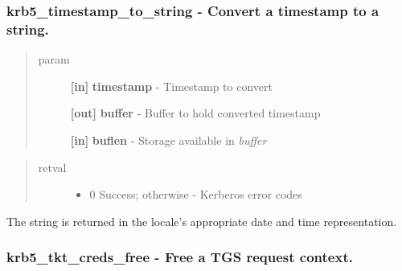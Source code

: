 \documentclass[letterpaper,10pt,english]{sphinxmanual}
\begin{document}
\subsubsection{krb5\_timestamp\_to\_string -  Convert a timestamp to a string.}
\label{appdev/refs/api/krb5_timestamp_to_string::doc}\label{appdev/refs/api/krb5_timestamp_to_string:krb5-timestamp-to-string-convert-a-timestamp-to-a-string}

\begin{fulllineitems}
\label{appdev/refs/api/krb5_timestamp_to_string:krb5_timestamp_to_string}
\end{fulllineitems}

\begin{quote}\begin{description}
\item[{param}] \leavevmode
\textbf{{[}in{]}} \textbf{timestamp} - Timestamp to convert

\textbf{{[}out{]}} \textbf{buffer} - Buffer to hold converted timestamp

\textbf{{[}in{]}} \textbf{buflen} - Storage available in \emph{buffer}

\end{description}\end{quote}
\begin{quote}\begin{description}
\item[{retval}] \leavevmode\begin{itemize}
\item {} 
0   Success; otherwise - Kerberos error codes

\end{itemize}

\end{description}\end{quote}

The string is returned in the locale's appropriate date and time representation.


\subsubsection{krb5\_tkt\_creds\_free -  Free a TGS request context.}
\label{appdev/refs/api/krb5_tkt_creds_free::doc}\label{appdev/refs/api/krb5_tkt_creds_free:krb5-tkt-creds-free-free-a-tgs-request-context}
\end{document}
